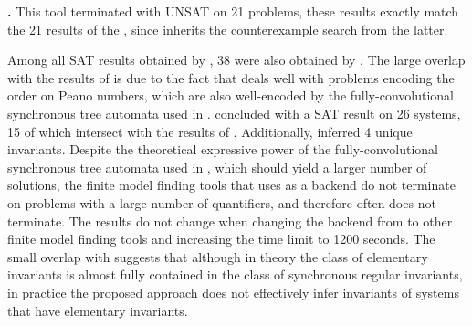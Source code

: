 \textbf{\ringenSync{}.} This tool terminated with UNSAT on 21 problems, these results exactly match the 21 results of the \ringen{\cvc{}}, since \ringenSync{} inherits the counterexample search from the latter.

Among all SAT results obtained by \eldarica{}, 38 were also obtained by \ringenSync{}.
The large overlap with the results of \eldarica{} is due to the fact that \eldarica{} deals well with problems encoding the order on Peano numbers, which are also well-encoded by the fully-convolutional synchronous tree automata used in \ringenSync{}. \racer{} concluded with a SAT result on 26 systems, 15 of which intersect with the results of \ringenSync{}. Additionally, \ringenSync{} inferred 4 unique invariants. Despite the theoretical expressive power of the fully-convolutional synchronous tree automata used in \ringenSync{}, which should yield a larger number of solutions, the finite model finding tools that \ringenSync{} uses as a backend do not terminate on problems with a large number of quantifiers, and therefore \ringenSync{} often does not terminate.
The results do not change when changing the backend from \cvc{} to other finite model finding tools and increasing the time limit to 1200 seconds. The small overlap with \racer{} suggests that although in theory the class of elementary invariants is almost fully contained in the class of synchronous regular invariants, in practice the proposed approach does not effectively infer invariants of systems that have elementary invariants.


